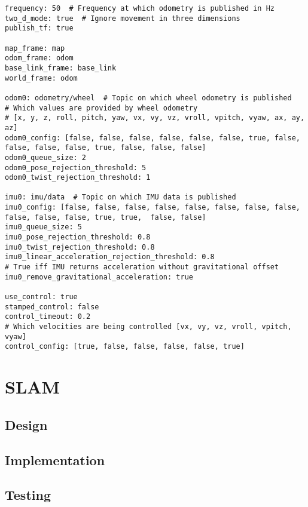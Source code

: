 \begin{lstlisting}[caption={EKF YAML file}, label={lst:ekf_yaml}, style=yaml]
frequency: 50  # Frequency at which odometry is published in Hz
two_d_mode: true  # Ignore movement in three dimensions
publish_tf: true

map_frame: map
odom_frame: odom
base_link_frame: base_link
world_frame: odom

odom0: odometry/wheel  # Topic on which wheel odometry is published
# Which values are provided by wheel odometry
# [x, y, z, roll, pitch, yaw, vx, vy, vz, vroll, vpitch, vyaw, ax, ay, az]
odom0_config: [false, false, false, false, false, false, true, false, false, false, false, true, false, false, false]
odom0_queue_size: 2
odom0_pose_rejection_threshold: 5
odom0_twist_rejection_threshold: 1

imu0: imu/data  # Topic on which IMU data is published
imu0_config: [false, false, false, false, false, false, false, false, false, false, false, true, true,  false, false]
imu0_queue_size: 5
imu0_pose_rejection_threshold: 0.8
imu0_twist_rejection_threshold: 0.8
imu0_linear_acceleration_rejection_threshold: 0.8
# True iff IMU returns acceleration without gravitational offset
imu0_remove_gravitational_acceleration: true

use_control: true
stamped_control: false
control_timeout: 0.2
# Which velocities are being controlled [vx, vy, vz, vroll, vpitch, vyaw]
control_config: [true, false, false, false, false, true]
\end{lstlisting}





\section{SLAM}\label{soft/SLAM}

\subsection{Design}\label{soft/SLAM/design}

\subsection{Implementation}\label{soft/SLAM/impl}

\subsection{Testing}\label{soft/SLAM/test}



